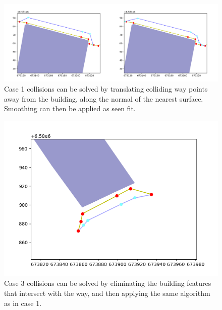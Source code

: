 \documentclass[a4paper]{article}
\begin{document}
\begin{figure}[H]
    \centering
    \includegraphics[width=\textwidth,height=0.5\textheight,keepaspectratio]{img_feature_overlap_fix_1}
    \caption{Case 1 collisions can be solved by translating colliding way points away from the building, along the normal of the nearest surface. Smoothing can then be applied as seen fit.}
    \label{fig:collision-case-1}
\end{figure}

\begin{figure}[H]
    \centering
    \includegraphics[width=\textwidth,height=0.5\textheight,keepaspectratio]{img_feature_overlap_fix_2}
    \caption{Case 3 collisions can be solved by eliminating the building features that intersect with the way, and then applying the same algorithm as in case 1.}
    \label{fig:collision-case-3}
\end{figure}
\end{document}
